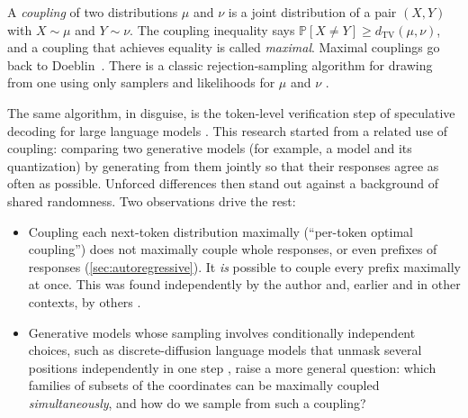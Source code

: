 \documentclass[11pt]{article}
\theoremstyle{definition}
\newcommand{\TV}{d_{\mathrm{TV}}}
\renewcommand{\Pr}{\mathbb{P}}
\begin{document}
A \emph{coupling} of two distributions $\mu$ and $\nu$ is a joint distribution of a
pair $(X,Y)$ with $X\sim\mu$ and $Y\sim\nu$. The coupling inequality says
$\Pr[X\neq Y]\ge \TV(\mu,\nu)$, and a coupling that achieves equality is called
\emph{maximal}. Maximal couplings go back to Doeblin~\cite{lindvall1991doeblin}.
There is a classic rejection-sampling algorithm for drawing from one using only
samplers and likelihoods for $\mu$ and $\nu$ \cite{johnson1998coupling}.

The same algorithm, in disguise, is the token-level verification step of
speculative decoding for large language models
\cite{leviathan2023fast,chen2023accelerating,sun2023spectr}. This research
started from a related use of coupling: comparing two generative models (for
example, a model and its quantization) by generating from them jointly so that
their responses agree as often as possible. Unforced differences then stand out
against a background of shared randomness. Two observations drive the rest:
\begin{itemize}
  \item Coupling each next-token distribution maximally (``per-token optimal
  coupling'') does not maximally couple whole responses, or even prefixes of
  responses (\cref{sec:autoregressive}). It \emph{is} possible to couple every
  prefix maximally at once. This was found independently by the author and,
  earlier and in other contexts, by others
  \cite{vollering2016maximal,ernst2019mexit,sun2024block}.
  \item Generative models whose sampling involves conditionally independent
  choices, such as discrete-diffusion language models that unmask several
  positions independently in one step \cite{lou2024discrete}, raise a more
  general question: which families of subsets of the coordinates can be
  maximally coupled \emph{simultaneously}, and how do we sample from such a
  coupling?
\end{itemize}
\end{document}
